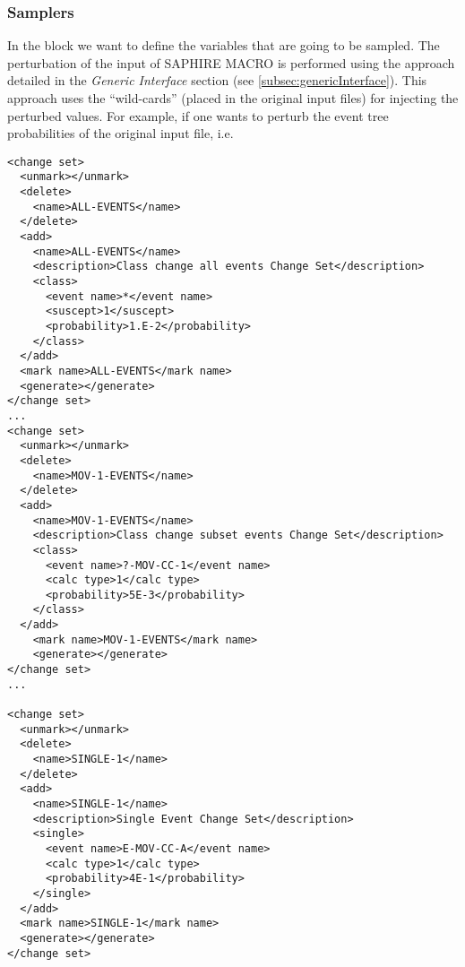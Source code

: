 \subsubsection{Samplers}
In the  block we want to define the variables that are going to be sampled.
The perturbation of the input of SAPHIRE MACRO is performed using the approach detailed in the
\textit{Generic Interface} section (see \ref{subsec:genericInterface}). This approach uses the
``wild-cards'' (placed in the original input files) for injecting the perturbed values. For example,
if one wants to perturb the event tree probabilities of the original input file, i.e.
\begin{lstlisting}[style=XML]
<change set>
  <unmark></unmark>
  <delete>
    <name>ALL-EVENTS</name>
  </delete>
  <add>
    <name>ALL-EVENTS</name>
    <description>Class change all events Change Set</description>
    <class>
      <event name>*</event name>
      <suscept>1</suscept>
      <probability>1.E-2</probability>
    </class>
  </add>
  <mark name>ALL-EVENTS</mark name>
  <generate></generate>
</change set>
...
<change set>
  <unmark></unmark>
  <delete>
    <name>MOV-1-EVENTS</name>
  </delete>
  <add>
    <name>MOV-1-EVENTS</name>
    <description>Class change subset events Change Set</description>
    <class>
      <event name>?-MOV-CC-1</event name>
      <calc type>1</calc type>
      <probability>5E-3</probability>
    </class>
  </add>
    <mark name>MOV-1-EVENTS</mark name>
    <generate></generate>
</change set>
...

<change set>
  <unmark></unmark>
  <delete>
    <name>SINGLE-1</name>
  </delete>
  <add>
    <name>SINGLE-1</name>
    <description>Single Event Change Set</description>
    <single>
      <event name>E-MOV-CC-A</event name>
      <calc type>1</calc type>
      <probability>4E-1</probability>
    </single>
  </add>
  <mark name>SINGLE-1</mark name>
  <generate></generate>
</change set>
\end{lstlisting}


